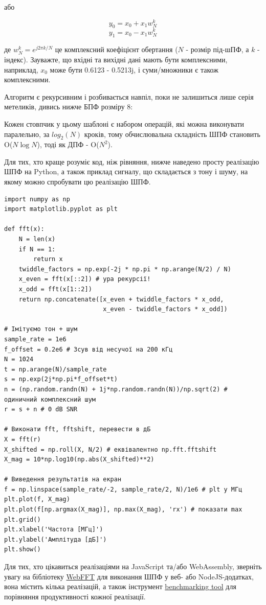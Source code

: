 \href{../_images/butterfly.svg}{}

або

\[y_0 = x_0 + x_1 w^k_N\]\[y_1 = x_0 - x_1 w^k_N\]

де \(w^k_N = e^{j2\pi k/N}\) це комплексний коефіцієнт обертання (\(N\)
- розмір під-шПФ, а \(k\) - індекс). Зауважте, що вхідні та вихідні дані
мають бути комплексними, наприклад, \(x_0\) може бути 0.6123 - 0.5213j,
і суми/множники є також комплексними.

Алгоритм є рекурсивним і розбивається навпіл, поки не залишиться лише
серія метеликів, дивись нижче БПФ розміру 8:

\href{../_images/butterfly2.svg}{}

Кожен стовпчик у цьому шаблоні є набором операцій, які можна виконувати
паралельно, за \(log_2(N)\) кроків, тому обчислювальна складність ШПФ
становить O(\(N\log N\)), тоді як ДПФ - O(\(N^2\)).

Для тих, хто краще розуміє код, ніж рівняння, нижче наведено просту
реалізацію ШПФ на Python, а також приклад сигналу, що складається з тону
і шуму, на якому можно спробувати цю реалізацію ШПФ.

\begin{Verbatim}[breaklines=true,breakanywhere=true,fontsize=\small]
import numpy as np
import matplotlib.pyplot as plt

def fft(x):
    N = len(x)
    if N == 1:
        return x
    twiddle_factors = np.exp(-2j * np.pi * np.arange(N/2) / N)
    x_even = fft(x[::2]) # ура рекурсії!
    x_odd = fft(x[1::2])
    return np.concatenate([x_even + twiddle_factors * x_odd,
                           x_even - twiddle_factors * x_odd])

# Імітуємо тон + шум
sample_rate = 1e6
f_offset = 0.2e6 # Зсув від несучої на 200 кГц
N = 1024
t = np.arange(N)/sample_rate
s = np.exp(2j*np.pi*f_offset*t)
n = (np.random.randn(N) + 1j*np.random.randn(N))/np.sqrt(2) # одиничний комплексний шум
r = s + n # 0 dB SNR

# Виконати fft, fftshift, перевести в дБ
X = fft(r)
X_shifted = np.roll(X, N/2) # еквівалентно np.fft.fftshift
X_mag = 10*np.log10(np.abs(X_shifted)**2)

# Виведення результатів на екран
f = np.linspace(sample_rate/-2, sample_rate/2, N)/1e6 # plt у МГц
plt.plot(f, X_mag)
plt.plot(f[np.argmax(X_mag)], np.max(X_mag), 'rx') # показати max
plt.grid()
plt.xlabel('Частота [МГц]')
plt.ylabel('Амплітуда [дБ]')
plt.show()
\end{Verbatim}

\href{../_images/fft_in_python.svg}{}

Для тих, хто цікавиться реалізаціями на JavaScript та/або WebAssembly,
зверніть увагу на бібліотеку
\href{https://github.com/IQEngine/WebFFT}{WebFFT} для виконання ШПФ у
веб- або NodeJS-додатках, вона містить кілька реалізацій, а також
інструмент \href{https://webfft.com}{benchmarking tool} для порівняння
продуктивності кожної реалізації.
